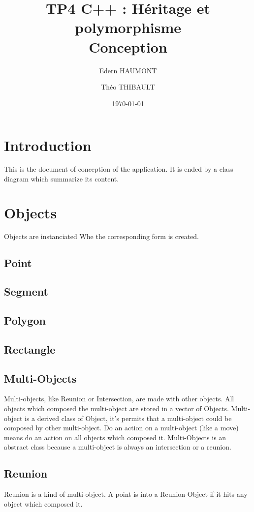 \documentclass[a4paper, 12pts]{article}
\title{TP4 C++ : Héritage et polymorphisme \\
    \large Conception}
\author{Edern HAUMONT}
\author{Théo THIBAULT}
\affil{B3133}
\date{\today}
\begin{document}

\maketitle



\section{Introduction}
	This is the document of conception of the application. It is ended by a class diagram which summarize its content.

\section{Objects}
    Objects are instanciated Whe the corresponding form is created.
    \subsection{Point}
    \subsection{Segment}
    \subsection{Polygon}
    \subsection{Rectangle}
    \subsection{Multi-Objects}
        Multi-objects, like Reunion or Intersection, are made with other objects. All objects which composed the multi-object are
        stored in a vector of Objects. Multi-object is a derived class of Object, it's permits that a multi-object could be composed
        by other multi-object. Do an action on a multi-object (like a move) means do an action on all objects which composed it.
        Multi-Objects is an abstract class because a multi-object is always an intersection or a reunion.
    \subsection{Reunion}
        Reunion is a kind of multi-object. A point is into a Reunion-Object if it hits any object which composed it.
\end{document}
